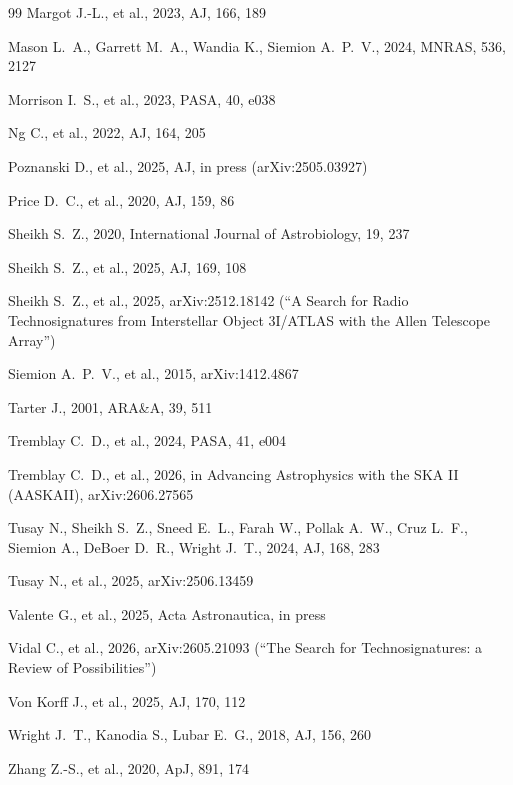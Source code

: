\documentclass{openjournal}
\begin{document}
\begin{thebibliography}{99}
 Margot J.-L., et al., 2023, AJ, 166, 189

 Mason L.~A., Garrett M.~A., Wandia K., Siemion A.~P.~V., 2024, MNRAS, 536, 2127

 Morrison I.~S., et al., 2023, PASA, 40, e038

 Ng C., et al., 2022, AJ, 164, 205

 Poznanski D., et al., 2025, AJ, in press (arXiv:2505.03927)

 Price D.~C., et al., 2020, AJ, 159, 86

 Sheikh S.~Z., 2020, International Journal of Astrobiology, 19, 237

 Sheikh S.~Z., et al., 2025, AJ, 169, 108

 Sheikh S.~Z., et al., 2025, arXiv:2512.18142 (``A Search for Radio Technosignatures from Interstellar Object 3I/ATLAS with the Allen Telescope Array'')

 Siemion A.~P.~V., et al., 2015, arXiv:1412.4867

 Tarter J., 2001, ARA\&A, 39, 511

 Tremblay C.~D., et al., 2024, PASA, 41, e004

 Tremblay C.~D., et al., 2026, in Advancing Astrophysics with the SKA II (AASKAII), arXiv:2606.27565

 Tusay N., Sheikh S.~Z., Sneed E.~L., Farah W., Pollak A.~W., Cruz L.~F., Siemion A., DeBoer D.~R., Wright J.~T., 2024, AJ, 168, 283

 Tusay N., et al., 2025, arXiv:2506.13459

 Valente G., et al., 2025, Acta Astronautica, in press

 Vidal C., et al., 2026, arXiv:2605.21093 (``The Search for Technosignatures: a Review of Possibilities'')

 Von Korff J., et al., 2025, AJ, 170, 112

 Wright J.~T., Kanodia S., Lubar E.~G., 2018, AJ, 156, 260

 Zhang Z.-S., et al., 2020, ApJ, 891, 174

\end{thebibliography}
\end{document}
